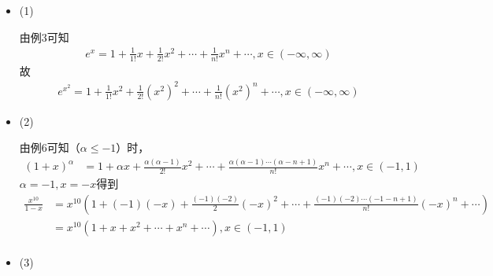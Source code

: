 \documentclass{article}
\begin{document}
\begin{itemize}
  \item (1)

        由例3可知
        \begin{align*}
          e^x = 1 + \frac{1}{1!}x + \frac{1}{2!}x^2 + \cdots + \frac{1}{n!}x^n + \cdots,
          x \in (-\infty, \infty)
        \end{align*}
        故
        \begin{align*}
          e^{x^2} = 1 + \frac{1}{1!}x^2 + \frac{1}{2!}(x^2)^2 + \cdots + \frac{1}{n!}(x^2)^n + \cdots,
          x \in (-\infty, \infty)
        \end{align*}

  \item (2)

        由例6可知（$\alpha \leq -1$）时，
        \begin{align*}
          (1 + x)^{\alpha}
           & = 1 + \alpha x + \frac{\alpha(\alpha - 1)}{2!} x^2 + \cdots + \frac{\alpha(\alpha - 1)\cdots(\alpha - n + 1)}{n!} x^n + \cdots,
          x \in (-1, 1)
        \end{align*}
        $\alpha = -1, x = -x$得到
        \begin{align*}
          \frac{x^{10}}{1 - x}
           & = x^{10} \left(1 + (-1)(-x) + \frac{(-1)(-2)}{2}(-x)^2 + \cdots + \frac{(-1)(-2)\cdots(-1 - n + 1)}{n!}(-x)^n + \cdots \right) \\
           & = x^{10} \left(1 + x + x^2 + \cdots + x^n + \cdots \right), x \in (-1, 1)                                                      \\
        \end{align*}

  \item (3)


\end{itemize}
\end{document}

